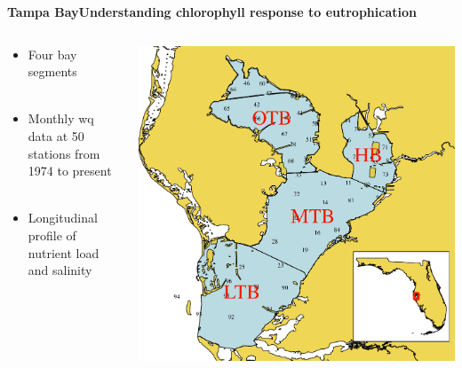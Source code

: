 \documentclass[serif]{beamer}\usepackage[]{graphicx}\usepackage[]{color}
\begin{document}


\begin{frame}{\textbf{Tampa Bay}}{\textbf{Understanding chlorophyll response to eutrophication}}
\begin{columns}
\begin{column}{0.5\textwidth}
\begin{itemize}
\item Four bay segments\\~\\
\item Monthly wq data at 50 stations from 1974 to present \\~\\
\item Longitudinal profile of nutrient load and salinity \\~\\
\end{itemize}
\vspace{0cm}\hspace*{15pt}
\end{column}
\begin{column}{0.5\textwidth}
\centerline{\includegraphics[width = \textwidth]{fig/tb_map.pdf}}
\end{column}
\end{columns}
\end{frame}
\end{document}
